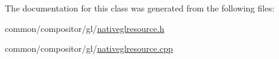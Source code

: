 The documentation for this class was generated from the following files\+:\begin{DoxyCompactItemize}
\item 
common/compositor/gl/\mbox{\hyperlink{nativeglresource_8h}{nativeglresource.\+h}}\item 
common/compositor/gl/\mbox{\hyperlink{nativeglresource_8cpp}{nativeglresource.\+cpp}}\end{DoxyCompactItemize}
